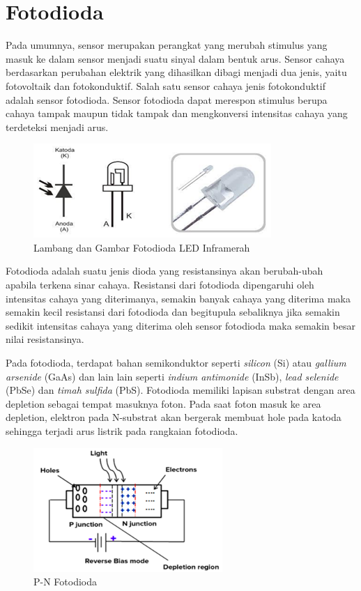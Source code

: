 \section{Fotodioda}
Pada umumnya, sensor merupakan perangkat yang merubah stimulus yang masuk ke dalam sensor menjadi
suatu sinyal dalam bentuk arus. Sensor cahaya berdasarkan perubahan elektrik yang dihasilkan dibagi
menjadi dua jenis, yaitu fotovoltaik dan fotokonduktif. Salah satu sensor cahaya jenis fotokonduktif
adalah sensor fotodioda. Sensor fotodioda dapat merespon stimulus berupa cahaya tampak maupun tidak
tampak dan mengkonversi intensitas cahaya yang terdeteksi menjadi arus\cite{Setyaningsih2017}.

\begin{figure}[H]
    \centering
    \includegraphics{Images/Fotodioda.png}
    \caption{Lambang dan Gambar Fotodioda LED Inframerah}
    \label{fig:led photodiode}
\end{figure}

Fotodioda adalah suatu jenis dioda yang resistansinya akan berubah-ubah apabila terkena sinar
cahaya. Resistansi dari fotodioda dipengaruhi oleh intensitas cahaya yang diterimanya, semakin
banyak cahaya yang diterima maka semakin kecil resistansi dari fotodioda dan begitupula sebaliknya
jika semakin sedikit intensitas cahaya yang diterima oleh sensor fotodioda maka semakin besar nilai
resistansinya\cite{Setyaningsih2017,Arta2020}.

Pada fotodioda, terdapat bahan semikonduktor seperti \textit{silicon} (Si) atau \textit{gallium
arsenide} (GaAs) dan lain lain seperti \textit{indium antimonide} (InSb), \textit{lead selenide}
(PbSe) dan \textit{timah sulfida} (PbS). Fotodioda memiliki lapisan substrat dengan area depletion
sebagai tempat masuknya foton. Pada saat foton masuk ke area depletion, elektron pada N-substrat
akan bergerak membuat hole pada katoda sehingga terjadi arus listrik pada rangkaian fotodioda.

\begin{figure}[H]
    \centering
    \includegraphics{Images/Bias Fotodioda.png}
    \caption{P-N Fotodioda}
    \label{fig:p-n photodiode}
\end{figure}

